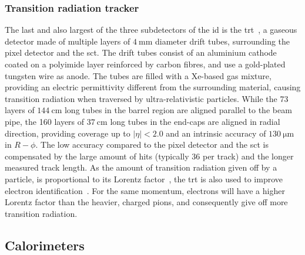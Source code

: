 \subsubsection{Transition radiation tracker}

The last and also largest of the three subdetectors of the \gls{id} is the \gls{trt}~\cite{Aad:2008zzm}, a gaseous detector made of multiple layers of $\SI{4}{\milli\meter}$ diameter drift tubes, surrounding the pixel detector and the \gls{sct}.
The drift tubes consist of an aluminium cathode coated on a polyimide layer reinforced by carbon fibres, and use a gold-plated tungsten wire as anode.
The tubes are filled with a Xe-based gas mixture, providing an electric permittivity different from the surrounding material, causing transition radiation when traversed by ultra-relativistic particles.
While the 73 layers of $\SI{144}{\centi\meter}$ long tubes in the barrel region are aligned parallel to the beam pipe, the 160 layers of $\SI{37}{\centi\meter}$ long tubes in the end-caps are aligned in radial direction, providing coverage up to $\vert\eta\vert <2.0$ and an intrinsic accuracy of $\SI{130}{\micro\meter}$ in $R-\phi$.
The low accuracy compared to the pixel detector and the \gls{sct} is compensated by the large amount of hits (typically $36$ per track) and the longer measured track length.
As the amount of transition radiation given off by a particle, is proportional to its Lorentz factor~\cite{pdg2020}, the \gls{trt} is also used to improve electron identification~\cite{ATLAS-CONF-2011-128}.
For the same momentum, electrons will have a higher Lorentz factor than the heavier, charged pions, and consequently give off more transition radiation.

\subsection{Calorimeters}


